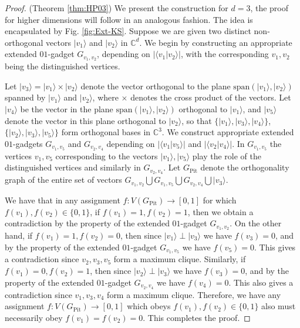 \documentclass[twocolumn, a4paper, superscriptaddress,nofootinbib, accepted=2020-08-07, hyperref]{quantumarticle}
\begin{document}
\begin{proof}(Theorem \ref{thm:HP03})
We present the construction for $d=3$, the proof for higher dimensions will follow in an analogous fashion. The idea is encapsulated by Fig. \ref{fig:Ext-KS}. Suppose we are given two distinct non-orthogonal vectors $|v_1 \rangle$ and $|v_2 \rangle$ in $\mathbb{C}^d$. We begin by constructing an appropriate extended $01$-gadget $G_{v_1,v_2}$, depending on $| \langle v_1 | v_2 \rangle|$, with the corresponding $v_1, v_2$ being the distinguished vertices. \ 

Let $|v_3 \rangle = |v_1 \rangle \times |v_2 \rangle$ denote the vector orthogonal to the plane $\text{span}(|v_1 \rangle, |v_2\rangle)$ spanned by $|v_1 \rangle$ and $|v_2 \rangle$, where $\times$ denotes the cross product of the vectors. Let $|v_4 \rangle$ be the vector in the plane $\text{span}(|v_1 \rangle, |v_2\rangle)$ orthogonal to $|v_1 \rangle$, and $|v_5 \rangle$ denote the vector in this plane orthogonal to $|v_2 \rangle$, so that $\{|v_1 \rangle, |v_3 \rangle, |v_4 \rangle\}$, $\{|v_2 \rangle, |v_3 \rangle, |v_5 \rangle\}$ form orthogonal bases in $\mathbb{C}^3$. We construct appropriate extended $01$-gadgets $G_{v_1, v_5}$ and $G_{v_2, v_4}$ depending on $| \langle v_1 | v_5 \rangle|$ and $| \langle v_2 | v_4 \rangle|$. In $G_{v_1, v_5}$ the vertices $v_1, v_5$ corresponding to the vectors $|v_1 \rangle, |v_5 \rangle$ play the role of the distinguished vertices and similarly in $G_{v_2, v_4}$. Let $G_{\text{Pit}}$ denote the orthogonality graph of the entire set of vectors ${G_{v_1, v_2}} \bigcup {G_{v_1, v_5}} \bigcup {G_{v_2, v_4}} \bigcup |v_3 \rangle$. 

We have that in any assignment $f: V(G_{\text{Pit}}) \rightarrow [0,1]$ for which $f(v_1), f(v_2) \in \{0,1\}$, if $f(v_1) = 1, f(v_2) = 1$, then we obtain a contradiction by the property of the extended $01$-gadget $G_{v_1,v_2}$. On the other hand, if $f(v_1) = 1, f(v_2) = 0$, then since $|v_1 \rangle \perp |v_3 \rangle$ we have $f(v_3) = 0$, and by the property of the extended $01$-gadget $G_{v_1, v_5}$ we have $f(v_5) = 0$. This gives a contradiction since $v_2, v_3, v_5$ form a maximum clique. Similarly, if $f(v_1) = 0, f(v_2) = 1$, then since $|v_2 \rangle \perp |v_3 \rangle$ we have $f(v_3) = 0$, and by the property of the extended $01$-gadget $G_{v_2, v_4}$ we have $f(v_4) = 0$. This also gives a contradiction since $v_1, v_3, v_4$ form a maximum clique. Therefore, we have any assignment $f: V(G_{\text{Pit}}) \rightarrow [0,1]$ which obeys $f(v_1), f(v_2) \in \{0,1\}$ also must necessarily obey $f(v_1) = f(v_2) = 0$. This completes the proof.


\end{proof}
\end{document}
